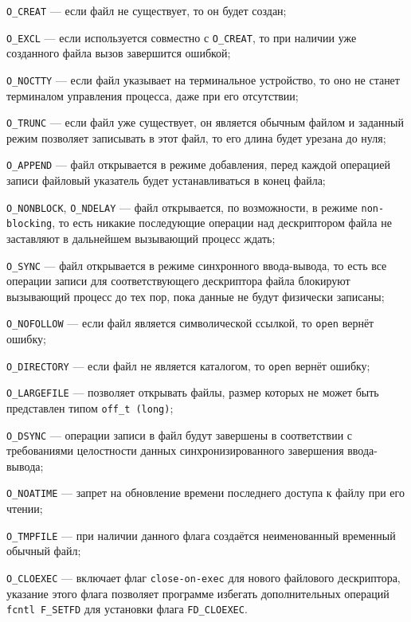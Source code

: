 \texttt{O\_CREAT} --- если файл не существует, то он будет создан;

\texttt{O\_EXCL} --- если используется совместно с \texttt{O\_CREAT}, то при наличии уже созданного файла вызов завершится ошибкой;

\texttt{O\_NOCTTY} --- если файл указывает на терминальное устройство, то оно не станет терминалом управления процесса, даже при его отсутствии;

\texttt{O\_TRUNC} --- если файл уже существует, он является обычным файлом и заданный режим позволяет записывать в этот файл, то его длина будет урезана до нуля;

\texttt{O\_APPEND} --- файл открывается в режиме добавления, перед каждой операцией записи файловый указатель будет устанавливаться в конец файла;

\texttt{O\_NONBLOCK}, \texttt{O\_NDELAY} --- файл открывается, по возможности, в режиме \texttt{non-blocking}, то есть никакие последующие операции над дескриптором файла не заставляют в дальнейшем вызывающий процесс ждать;

\texttt{O\_SYNC} --- файл открывается в режиме синхронного ввода-вывода, то есть все операции записи для соответствующего дескриптора файла блокируют вызывающий процесс до тех пор, пока данные не будут физически записаны;

\texttt{O\_NOFOLLOW} --- если файл является символической ссылкой, то \texttt{open} вернёт ошибку;

\texttt{O\_DIRECTORY} --- если файл не является каталогом, то \texttt{open} вернёт ошибку;

\texttt{O\_LARGEFILE} --- позволяет открывать файлы, размер которых не может быть представлен типом \texttt{off\_t (long)};

\texttt{O\_DSYNC} --- операции записи в файл будут завершены в соответствии с требованиями целостности данных синхронизированного завершения ввода-вывода;

\texttt{O\_NOATIME} --- запрет на обновление времени последнего доступа к файлу при его чтении;

\texttt{O\_TMPFILE} --- при наличии данного флага создаётся неименованный временный обычный файл;

\texttt{O\_CLOEXEC} --- включает флаг \texttt{close-on-exec} для нового файлового дескриптора, указание этого флага позволяет программе избегать дополнительных операций \texttt{fcntl F\_SETFD} для установки флага \texttt{FD\_CLOEXEC}.